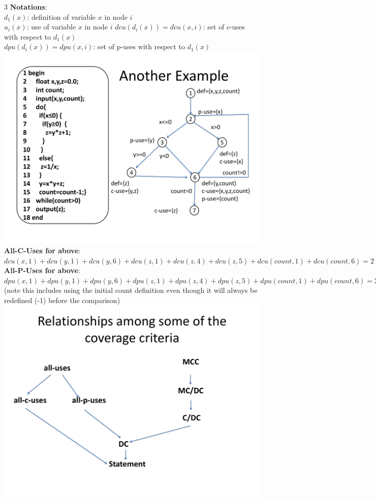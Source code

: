 \documentclass[a4paper]{article}
\begin{document}
\begin{multicols}{3}
        \textbf{Notations}:\\
        $d_1(x)$: definition of variable $x$ in node $i$\\
        $u_i(x)$: use of variable $x$ in node $i$
        $dcu(d_i(x)) = dcu(x,i)$: set of c-uses with respect to $d_1(x)$\\
        $dpu(d_i(x)) = dpu(x,i)$: set of p-uses with respect to $d_1(x)$\\
        \includegraphics[width=\linewidth]{196.pdf}\\
        \textbf{All-C-Uses for above}: $dcu(x,1) + dcu(y,1) + dcu(y,6) + dcu(z,1) + dcu(z,4) + dcu(z,5) + dcu(count,1) + dcu(count,6) = 2 + 2 + 2 + 3 + 3 + 3 + 1 + 1 = 17$\\
        \textbf{All-P-Uses for above}: $dpu(x,1) + dpu(y,1) + dpu(y,6) + dpu(z,1) + dpu(z,4) + dpu(z,5) + dpu(count,1) + dpu(count,6) = 2 + 2 + 2 + 0 + 0 + 0 + 2 + 2 = 10$ (note this includes using the initial count definition even though it will always be redefined (-1) before the comparison)\\
        \includegraphics[width=\linewidth]{203.pdf}\\
    \end{multicols}
    
\end{document}
